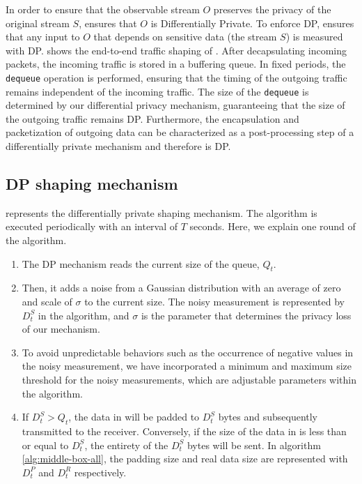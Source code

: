 In order to ensure that the observable stream $O$ preserves the privacy of the
original stream $S$, {\sys} ensures that $O$ is Differentially Private.
To enforce DP, {\sys} ensures that any input to $O$ that depends on sensitive
data (the stream $S$) is measured with DP.
 shows the end-to-end traffic shaping of {\sys}.
After decapsulating incoming packets, the incoming traffic is stored in a
buffering queue. In fixed periods, the \texttt{dequeue} operation is performed,
ensuring that the timing of the outgoing traffic remains independent of the
incoming traffic. The size of the \texttt{dequeue} is determined by our
differential privacy mechanism, guaranteeing that the size of the outgoing
traffic remains DP.
Furthermore, the encapsulation and packetization of outgoing data can be
characterized as a post-processing step of a differentially private mechanism
and therefore is DP.
\fi


\subsection{DP shaping mechanism}
\label{subsec:dp-shaping}

 

 represents the differentially private shaping
mechanism.  The algorithm is executed periodically with an interval of $T$
seconds.  Here, we explain one round of the algorithm.
\begin{enumerate}
  \item The DP mechanism reads the current size of the queue, $Q_t$.
  \item Then, it adds a noise from a Gaussian distribution with an average of
  zero and scale of ${\sigma}$ to the current size. The noisy measurement is
  represented by $D^S_t$ in the algorithm, and $\sigma$ is the parameter that
  determines the privacy loss of our mechanism.
  \item To avoid unpredictable behaviors such as the occurrence of negative
  values in the noisy measurement, we have incorporated a minimum and maximum
  size threshold for the noisy measurements, which are adjustable parameters
  within the algorithm.
  \item If $D^S_t > Q_t$, the data in {\unshapedQ} will be padded to $D^S_t$
  bytes and subsequently transmitted to the receiver.
  Conversely, if the size of the data in {\unshapedQ} is less than or equal to
  $D^S_t$, the entirety of the $D^S_t$ bytes will be sent.  In algorithm
  \ref{alg:middle-box-all}, the padding size and real data size are represented
  with $D^P_t$ and $D^R_t$ respectively.
\end{enumerate}
\fi


